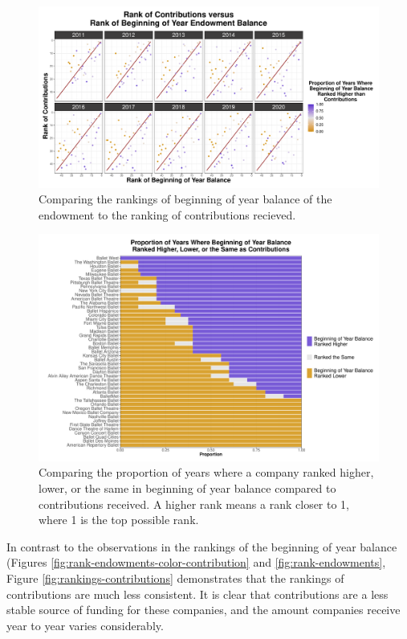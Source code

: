 \documentclass[Dance Data
Project,article,submit,moreauthors,pdftex]{mdpi}
\begin{document}
\begin{figure}[H]
\includegraphics[width=0.75\linewidth,]{../images/compare-rankings-balance-contributions} \caption{\label{fig:balancecont} Comparing the rankings of beginning of year balance of the endowment to the ranking of contributions recieved.}\label{fig:compare-rankings-balance-contributions}
\end{figure}

\begin{figure}[H]
\includegraphics[width=0.75\linewidth,]{../images/compare-rankings-balance-contributions-barplot} \caption{\label{fig:balancecontbar} Comparing the proportion of years where a company ranked higher, lower, or the same in beginning of year balance compared to contributions received. A higher rank means a rank closer to 1, where 1 is the top possible rank.}\label{fig:compare-rankings-balance-contributions-barplot}
\end{figure}

In contrast to the observations in the rankings of the beginning of year
balance (Figures \ref{fig:rank-endowments-color-contribution} and
\ref{fig:rank-endowments}, Figure \ref{fig:rankings-contributions}
demonstrates that the rankings of contributions are much less
consistent. It is clear that contributions are a less stable source of
funding for these companies, and the amount companies receive year to
year varies considerably.
\end{document}
